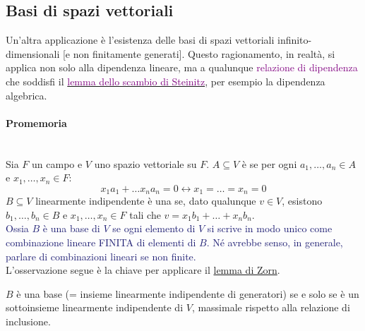 \documentclass[11pt]{scrartcl}
\begin{document}
\subsection{Basi di spazi vettoriali}

Un'altra applicazione è l'esistenza delle basi di spazi vettoriali infinito-dimensionali [e non finitamente generati]. Questo ragionamento, in realtà, si applica non solo alla dipendenza lineare, ma a qualunque \textcolor{purple}{relazione di dipendenza}
che soddisfi il \href{https://en.wikipedia.org/wiki/Steinitz_exchange_lemma}{\textcolor{purple}{lemma dello scambio di Steinitz}}, per esempio la dipendenza algebrica.

\paragraph*{Promemoria}\mbox{}\\
Sia $F$ un campo e $V$ uno spazio vettoriale su $F$. $A \subseteq V$ è  se per ogni $a_1,\ldots,a_n \in A$ e $x_1,\ldots,x_n \in F$:
\[ x_1a_1 + \ldots x_na_n = 0 \longleftrightarrow x_1 = \ldots = x_n = 0
	\]
$B \subseteq V$ linearmente indipendente è una  se, dato qualunque $v \in V$, esistono $b_1,\ldots,b_n \in B$ e $x_1,\ldots,x_n \in F$ tali che $v = x_1b_1+\ldots+x_nb_n$.\\
\textcolor{MidnightBlue}{Ossia $B$ è una base di $V$ se ogni elemento di $V$ si scrive in modo unico come combinazione lineare FINITA di elementi di $B$. Né avrebbe senso, in generale, parlare di combinazioni lineari se non finite.}\\

L'osservazione segue è la chiave per applicare il \hyperref[Zorn]{lemma di Zorn}.

\begin{remark}
	$B$ è una base (= insieme linearmente indipendente di generatori) se e solo se è un sottoinsieme linearmente indipendente di $V$, massimale rispetto alla relazione di inclusione.
\end{remark}
\end{document}
